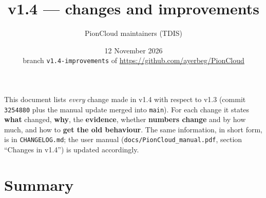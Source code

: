 \documentclass[11pt,a4paper]{article}
\title{\color{titleblue}\picloud{} v1.4 --- changes and improvements}
\author{PionCloud maintainers (TDIS)}
\date{12 November 2026 \\[2pt] \small branch \texttt{v1.4-improvements} of
\url{https://github.com/ayerbeg/PionCloud}}
\begin{document}
\maketitle

\noindent This document lists \emph{every} change made in v1.4 with respect to
v1.3 (commit \texttt{3254880} plus the manual update merged into
\texttt{main}).  For each change it states \textbf{what} changed, \textbf{why},
the \textbf{evidence}, whether \textbf{numbers change} and by how much, and how
to \textbf{get the old behaviour}.  The same information, in short form, is in
\texttt{CHANGELOG.md}; the user manual (\texttt{docs/PionCloud\_manual.pdf},
section ``Changes in v1.4'') is updated accordingly.

\section{Summary}
\end{document}
